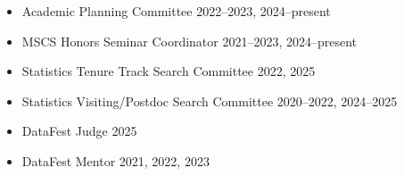 \documentclass[margin]{res}
\begin{document}
\begin{resume}
\begin{itemize}
\begin{itemize}
		\item Academic Planning Committee \hfill 2022--2023, 2024--present
		
		\item MSCS Honors Seminar Coordinator  \hfill 2021--2023, 2024--present %
		
		\item Statistics Tenure Track Search Committee \hfill 2022, 2025  
			
		\item Statistics Visiting/Postdoc Search Committee \hfill 2020--2022, 2024--2025
		
		\item DataFest Judge \hfill 2025
		
		\item DataFest Mentor  \hfill 2021, 2022, 2023%
		    
		

		
		\end{itemize}
	\end{itemize}



\end{resume}
\end{document}
